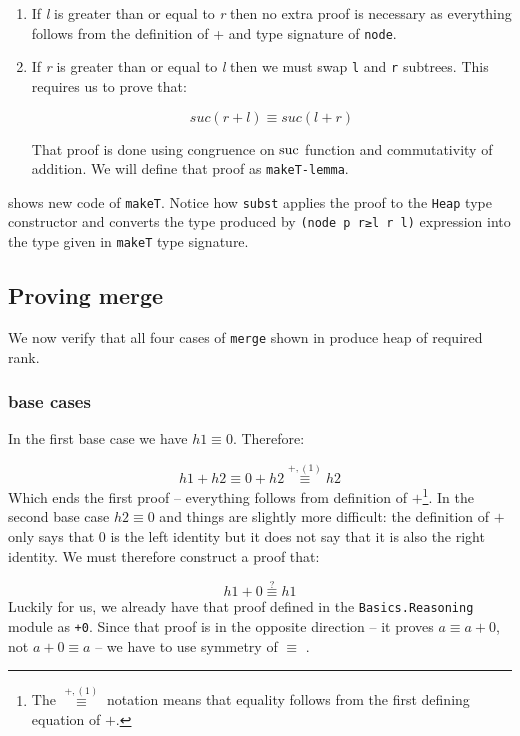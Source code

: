 \begin{enumerate}
 \item If \textit{l} is greater than or equal to \textit{r} then no extra proof is necessary as everything follows from the definition of + and type signature of \texttt{node}.
 \item If \textit{r} is greater than or equal to \textit{l} then we must swap \texttt{l} and \texttt{r} subtrees. This requires us to prove that:

\begin{equation*}
suc (r + l) ≡ suc (l + r)
\end{equation*}

That proof is done using congruence on $\operatorname{suc}$ function and commutativity of addition. We will define that proof as \texttt{makeT-lemma}.
\end{enumerate}
\noindent
{} shows new code of \texttt{makeT}. Notice how \texttt{subst} applies the proof to the \texttt{Heap} type constructor and converts the type produced by \texttt{(node p r≥l r l)} expression into the type given in \texttt{makeT} type signature.

\subsection{Proving merge}

We now verify that all four cases of \texttt{merge} shown in  produce heap of required rank.

\subsubsection{base cases}

In the first base case we have $h1 ≡ 0$. Therefore:

\begin{equation*}
h1 + h2 ≡ 0 + h2 \stackrel{+, (1)}{≡} h2
\end{equation*}
\noindent
Which ends the first proof -- everything follows from definition of $+$\footnote{The $\stackrel{+, (1)}{≡}$ notation means that equality follows from the first defining equation of $+$.}. In the second base case $h2 ≡ 0$ and things are slightly more difficult: the definition of $+$ only says that $0$ is the left identity but it does not say that it is also the right identity. We must therefore construct a proof that:

\begin{equation*}
h1 + 0 \stackrel{?}{≡} h1
\end{equation*}
\noindent
Luckily for us, we already have that proof defined in the \texttt{Basics.Reasoning} module as \texttt{+0}. Since that proof is in the opposite direction -- it proves $a ≡ a + 0$, not $a + 0 ≡ a$ -- we have to use symmetry of $≡$ .

